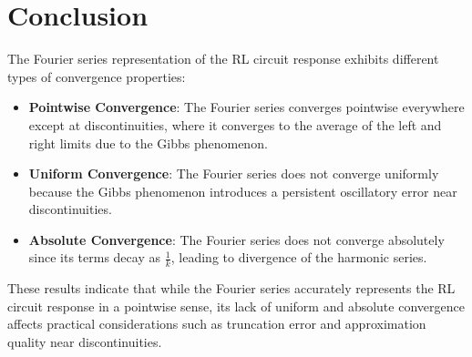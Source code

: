 \section{Conclusion}
The Fourier series representation of the RL circuit response exhibits different types of convergence properties:
\begin{itemize}
  \item \textbf{Pointwise Convergence}: The Fourier series converges pointwise everywhere except at discontinuities, where it converges to the average of the left and right limits due to the Gibbs phenomenon.
  \item \textbf{Uniform Convergence}: The Fourier series does not converge uniformly because the Gibbs phenomenon introduces a persistent oscillatory error near discontinuities.
  \item \textbf{Absolute Convergence}: The Fourier series does not converge absolutely since its terms decay as $\frac{1}{k}$, leading to divergence of the harmonic series.
\end{itemize}
These results indicate that while the Fourier series accurately represents the RL circuit response in a pointwise sense, its lack of uniform and absolute convergence affects practical considerations such as truncation error and approximation quality near discontinuities.
